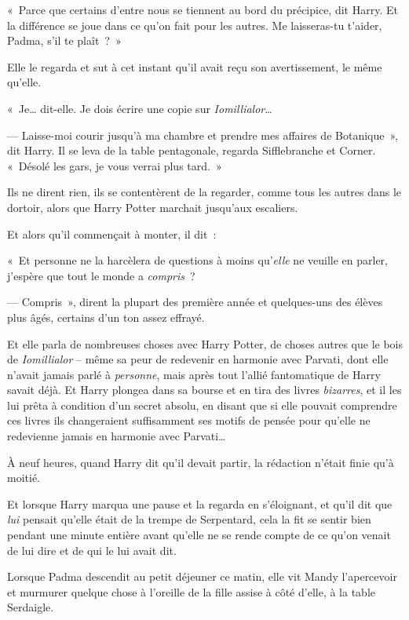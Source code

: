 «~Parce que certains d'entre nous se tiennent au bord du précipice, dit Harry. Et la différence se joue dans ce qu'on fait pour les autres. Me laisseras-tu t'aider, Padma, s'il te plaît~?~»

Elle le regarda et sut à cet instant qu'il avait reçu son avertissement, le même qu'elle.

«~Je… dit-elle. Je dois écrire une copie sur \emph{Iomillialor}…

--- Laisse-moi courir jusqu'à ma chambre et prendre mes affaires de Botanique~», dit Harry. Il se leva de la table pentagonale, regarda Sifflebranche et Corner. «~Désolé les gars, je vous verrai plus tard.~»

Ils ne dirent rien, ils se contentèrent de la regarder, comme tous les autres dans le dortoir, alors que Harry Potter marchait jusqu'aux escaliers.

Et alors qu'il commençait à monter, il dit~:

«~Et personne ne la harcèlera de questions à moins qu'\emph{elle} ne veuille en parler, j'espère que tout le monde a \emph{compris}~?

--- Compris~», dirent la plupart des première année et quelques-uns des élèves plus âgés, certains d'un ton assez effrayé.

\later

Et elle parla de nombreuses choses avec Harry Potter, de choses autres que le bois de \emph{Iomillialor} -- même sa peur de redevenir en harmonie avec Parvati, dont elle n'avait jamais parlé à \emph{personne}, mais après tout l'allié fantomatique de Harry savait déjà. Et Harry plongea dans sa bourse et en tira des livres \emph{bizarres}, et il les lui prêta à condition d'un secret absolu, en disant que si elle pouvait comprendre ces livres ils changeraient suffisamment ses motifs de pensée pour qu'elle ne redevienne jamais en harmonie avec Parvati…

À neuf heures, quand Harry dit qu'il devait partir, la rédaction n'était finie qu'à moitié.

Et lorsque Harry marqua une pause et la regarda en s'éloignant, et qu'il dit que \emph{lui} pensait qu'elle était de la trempe de Serpentard, cela la fit se sentir bien pendant une minute entière avant qu'elle ne se rende compte de ce qu'on venait de lui dire et de qui le lui avait dit.

\later

Lorsque Padma descendit au petit déjeuner ce matin, elle vit Mandy l'apercevoir et murmurer quelque chose à l'oreille de la fille assise à côté d'elle, à la table Serdaigle.

